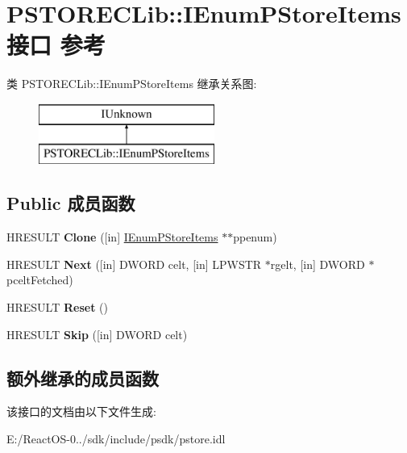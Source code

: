 \hypertarget{interface_p_s_t_o_r_e_c_lib_1_1_i_enum_p_store_items}{}\section{P\+S\+T\+O\+R\+E\+C\+Lib\+:\+:I\+Enum\+P\+Store\+Items接口 参考}
\label{interface_p_s_t_o_r_e_c_lib_1_1_i_enum_p_store_items}
类 P\+S\+T\+O\+R\+E\+C\+Lib\+:\+:I\+Enum\+P\+Store\+Items 继承关系图\+:\begin{figure}[H]
\begin{center}
\leavevmode
\includegraphics[height=2.000000cm]{interface_p_s_t_o_r_e_c_lib_1_1_i_enum_p_store_items}
\end{center}
\end{figure}
\subsection*{Public 成员函数}
\begin{DoxyCompactItemize}
\item 
\mbox{\label{interface_p_s_t_o_r_e_c_lib_1_1_i_enum_p_store_items_aededeae0b6df02eee9a181e9d6841823}} 
H\+R\+E\+S\+U\+LT {\bfseries Clone} (\mbox{[}in\mbox{]} \hyperlink{interface_p_s_t_o_r_e_c_lib_1_1_i_enum_p_store_items}{I\+Enum\+P\+Store\+Items} $\ast$$\ast$ppenum)
\item 
\mbox{\label{interface_p_s_t_o_r_e_c_lib_1_1_i_enum_p_store_items_afe129704b538d13c480dd5450ae09168}} 
H\+R\+E\+S\+U\+LT {\bfseries Next} (\mbox{[}in\mbox{]} D\+W\+O\+RD celt, \mbox{[}in\mbox{]} L\+P\+W\+S\+TR $\ast$rgelt, \mbox{[}in\mbox{]} D\+W\+O\+RD $\ast$pcelt\+Fetched)
\item 
\mbox{\label{interface_p_s_t_o_r_e_c_lib_1_1_i_enum_p_store_items_ad1b1f20bcefda9d160ce8ee17a06d819}} 
H\+R\+E\+S\+U\+LT {\bfseries Reset} ()
\item 
\mbox{\label{interface_p_s_t_o_r_e_c_lib_1_1_i_enum_p_store_items_a38719562cdaa69f1733a574166ae83a3}} 
H\+R\+E\+S\+U\+LT {\bfseries Skip} (\mbox{[}in\mbox{]} D\+W\+O\+RD celt)
\end{DoxyCompactItemize}
\subsection*{额外继承的成员函数}


该接口的文档由以下文件生成\+:\begin{DoxyCompactItemize}
\item 
E\+:/\+React\+O\+S-\/0../sdk/include/psdk/pstore.\+idl\end{DoxyCompactItemize}
